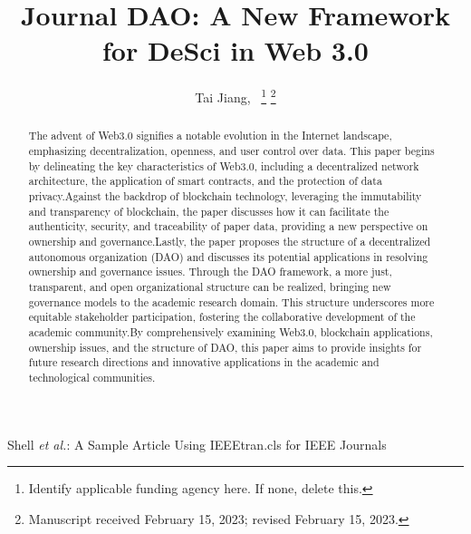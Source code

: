 \documentclass[lettersize,journal]{IEEEtran}
\begin{document}
\title{Journal DAO: A New Framework for DeSci in Web 3.0}

\author{Tai Jiang,~
\thanks{Identify applicable funding agency here. If none, delete this.}%
\thanks{Manuscript received February 15, 2023; revised February 15, 2023.}}

%
{Shell \MakeLowercase{\textit{et al.}}: A Sample Article Using IEEEtran.cls for IEEE Journals}


\maketitle

\begin{abstract}
The advent of Web3.0 signifies a notable evolution in the Internet landscape, emphasizing decentralization, openness, and user control over data. This paper begins by delineating the key characteristics of Web3.0, including a decentralized network architecture, the application of smart contracts, and the protection of data privacy.Against the backdrop of blockchain technology, leveraging the immutability and transparency of blockchain, the paper discusses how it can facilitate the authenticity, security, and traceability of paper data, providing a new perspective on ownership and governance.Lastly, the paper proposes the structure of a decentralized autonomous organization (DAO) and discusses its potential applications in resolving ownership and governance issues. Through the DAO framework, a more just, transparent, and open organizational structure can be realized, bringing new governance models to the academic research domain. This structure underscores more equitable stakeholder participation, fostering the collaborative development of the academic community.By comprehensively examining Web3.0, blockchain applications, ownership issues, and the structure of DAO, this paper aims to provide insights for future research directions and innovative applications in the academic and technological communities.
\end{abstract}
\end{document}
